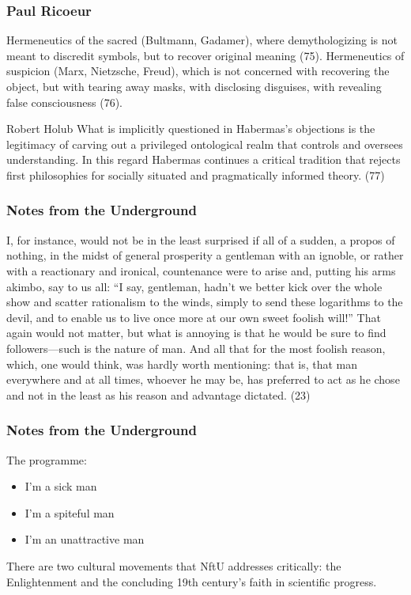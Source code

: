 \documentclass[xcolor=dvipsnames]{beamer}
\begin{document}
\begin{frame}
  \frametitle{Paul Ricoeur}
  \alert{Hermeneutics of the sacred} (Bultmann, Gadamer), where
  demythologizing is not meant to discredit symbols, but to recover
  original meaning (75). \alert{Hermeneutics of suspicion} (Marx,
  Nietzsche, Freud), which is not concerned with recovering the
  object, but with tearing away masks, with disclosing disguises, with
  revealing false consciousness (76).
  \begin{block}{Robert Holub}
    What is implicitly questioned in Habermas's objections is the
    legitimacy of carving out a privileged ontological realm that
    controls and oversees understanding. In this regard Habermas
    continues a critical tradition that rejects first philosophies for
    socially situated and pragmatically informed theory. (77)
  \end{block}
\end{frame}

\begin{frame}
  \frametitle{Notes from the Underground}
  I, for instance, would not be in the least surprised if all of a
  sudden, a propos of nothing, in the midst of general prosperity a
  gentleman with an ignoble, or rather with a reactionary and
  ironical, countenance were to arise and, putting his arms akimbo,
  say to us all: ``I say, gentleman, hadn't we better kick over the
  whole show and scatter rationalism to the winds, simply to send
  these logarithms to the devil, and to enable us to live once more at
  our own sweet foolish will!'' That again would not matter, but what
  is annoying is that he would be sure to find followers---such is the
  nature of man. And all that for the most foolish reason, which, one
  would think, was hardly worth mentioning: that is, that man
  everywhere and at all times, whoever he may be, has preferred to act
  as he chose and not in the least as his reason and advantage
  dictated. (23)
\end{frame}

\begin{frame}
  \frametitle{Notes from the Underground}
  The programme:
  \begin{itemize}
  \item I'm a sick man
  \item I'm a spiteful man
  \item I'm an unattractive man
  \end{itemize}
There are two cultural movements that NftU addresses critically: the
Enlightenment and the concluding 19th century's faith in scientific
progress. 
\end{frame}
\end{document}
